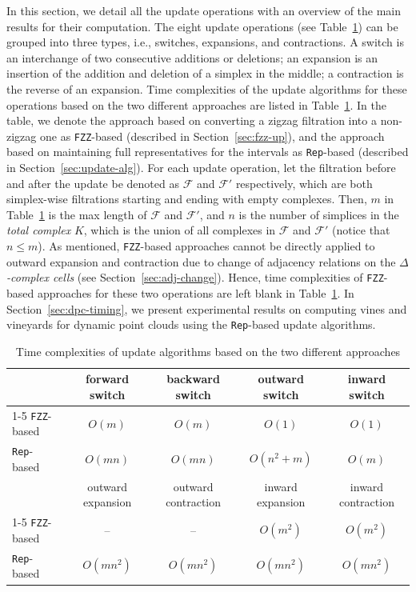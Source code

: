 \documentclass[letterpaper,11pt]{article}
\theoremstyle{mythmstyle}
\theoremstyle{mydefstyle}
\theoremstyle{plain}
\theoremstyle{definition}
\newcommand{\<}[1]{\langle #1\rangle}
\newcommand{\Fcal}{\mathcal{F}}
\newcommand{\DG}{\Delta}
\newcommand{\filtcnt}{m}
\newcommand{\simpcnt}{n}
\begin{document}
In this section,
we detail all the update operations
with an overview of the main results for their computation.
The eight update operations (see Table~\ref{tab:complexities}) can be grouped into three types, i.e.,
switches, expansions, and contractions.
A switch is an interchange of two consecutive additions or deletions;
an expansion is an insertion of the addition and deletion of a simplex
in the middle;
a contraction is the reverse of an expansion.
Time complexities of the update algorithms for these operations
based on the two different approaches 
are listed in Table~\ref{tab:complexities}. 
In the table,
we denote the approach based on converting a zigzag filtration into
a non-zigzag one as \texttt{FZZ}-based (described in Section~\ref{sec:fzz-up}),
and the approach based on maintaining full representatives
for the intervals as \texttt{Rep}-based (described in Section~\ref{sec:update-alg}).
For each update operation,
let the filtration before and after the update be denoted as $\Fcal$
and $\Fcal'$ respectively,
which are both simplex-wise filtrations
starting and ending with empty complexes.
Then,
$\filtcnt$ in Table~\ref{tab:complexities} is the max length of $\Fcal$ and $\Fcal'$,
and $\simpcnt$ 
is the number of simplices in the \emph{total complex} $K$,
which is the union of all complexes in $\Fcal$ and $\Fcal'$
(notice that $\simpcnt\leq\filtcnt$).
As mentioned,
\texttt{FZZ}-based approaches cannot be directly applied to 
outward expansion and contraction due to change of adjacency relations
on the \emph{$\DG$-complex cells} (see Section~\ref{sec:adj-change}).
Hence, time complexities of \texttt{FZZ}-based approaches for these
two operations are left blank in Table~\ref{tab:complexities}.
In Section~\ref{sec:dpc-timing},
we present experimental results on computing vines and vineyards for dynamic point clouds
using the \texttt{Rep}-based update algorithms.

\begin{table}[htbp!]
    \centering
    \caption{Time complexities of update algorithms based on the two different approaches}
    \label{tab:complexities}
    \begin{tabular}{l cccc}
         \toprule
          & forward switch & backward switch & outward switch & inward switch \\
         \cmidrule{1-5}
         \texttt{FZZ}-based & $O(\filtcnt)$ & $O(\filtcnt)$ & $O(1)$ & $O(1)$ \\ 
         \texttt{Rep}-based & $O(\filtcnt\simpcnt)$ & $O(\filtcnt\simpcnt)$ & $O(\simpcnt^2+\filtcnt)$ & $O(\filtcnt)$ \\ 
         \midrule
         & outward expansion & outward contraction & inward expansion & inward contraction \\
         \cmidrule{1-5}
        \texttt{FZZ}-based & -- & -- & $O(\filtcnt^2)$ & $O(\filtcnt^2)$ \\
        \texttt{Rep}-based & $O(\filtcnt\simpcnt^2)$ & $O(\filtcnt\simpcnt^2)$ & $O(\filtcnt\simpcnt^2)$ & $O(\filtcnt\simpcnt^2)$ \\
         \bottomrule
    \end{tabular}
\end{table}
\end{document}
